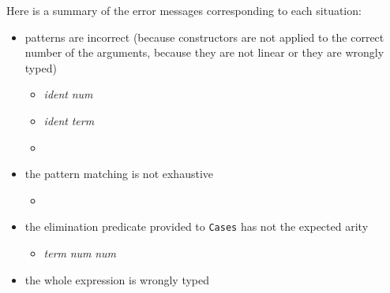 Here is a summary of the error messages corresponding to each situation:

\begin{itemize}
\item patterns are incorrect (because constructors are not applied to
  the correct number of the arguments, because they are not linear or
  they are wrongly typed)
\begin{itemize}
\item {} {\sl
    ident}  {\sl num} 
  
\item {} {\sl ident}  {\sl term}
  
\item {} {\term}
  {\term} 
\end{itemize}

\item the pattern matching is not exhaustive
\begin{itemize}
\item {}
\end{itemize}
\item the elimination predicate provided to \texttt{Cases} has not the
  expected arity

\begin{itemize}
\item {} {\sl term}  {\sl num}  {\sl
    num} 
\end{itemize}

\item the whole expression is wrongly typed

 
  

\end{itemize}
